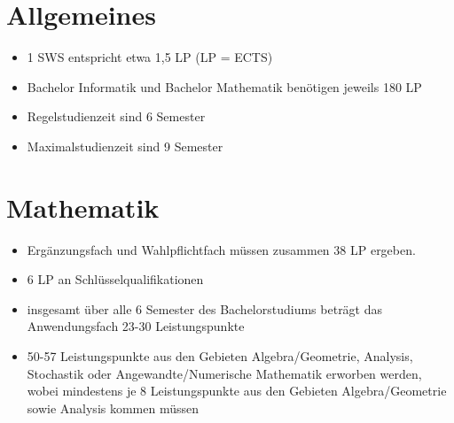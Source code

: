\documentclass[a4paper,landscape]{scrartcl}
\begin{document}
\section{Allgemeines}
\begin{itemize}
    \item 1 SWS entspricht etwa 1,5 LP (LP = ECTS)
    \item Bachelor Informatik und Bachelor Mathematik benötigen jeweils 180 LP
    \item Regelstudienzeit sind 6 Semester
    \item Maximalstudienzeit sind 9 Semester
\end{itemize}

\section{Mathematik}
\begin{itemize}
    \item Ergänzungsfach und Wahlpflichtfach müssen zusammen 38 LP ergeben.
    \item 6 LP an Schlüsselqualifikationen
    \item  insgesamt über alle 6 Semester des Bachelorstudiums beträgt das Anwendungsfach 23-30 Leistungspunkte
    \item 50-57 Leistungspunkte aus den Gebieten Algebra/Geometrie, Analysis, Stochastik oder Angewandte/Numerische Mathematik erworben werden, wobei mindestens je 8 Leistungspunkte aus den Gebieten Algebra/Geometrie sowie Analysis kommen müssen
\end{itemize}
\end{document}
